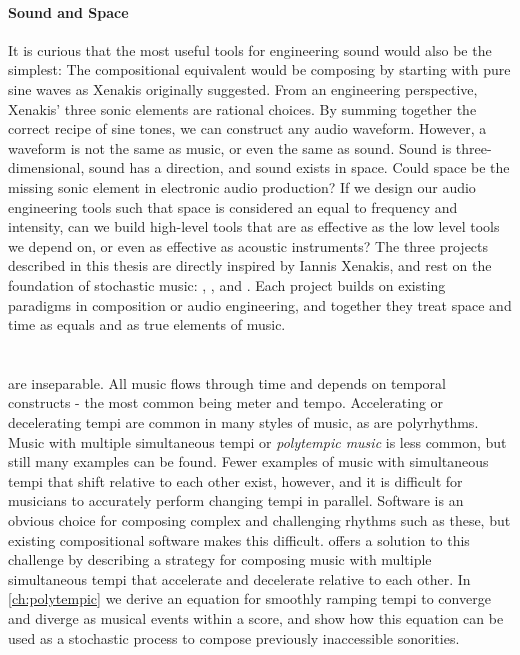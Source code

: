 \paragraph{Sound and Space}
It is curious that the most useful tools for engineering sound would
also be the simplest: The compositional equivalent would be composing
by starting with pure sine waves as Xenakis originally suggested.
From an engineering perspective, Xenakis' three sonic elements are
rational choices. By summing together the correct recipe of sine
tones, we can construct any audio waveform. However, a waveform is not
the same as music, or even the same as sound. Sound is
three-dimensional, sound has a direction, and sound exists in
space. Could space be the missing sonic element in electronic audio
production? If we design our audio engineering tools such that space
is considered an equal to frequency and intensity, can we build
high-level tools that are as effective as the low level tools we depend
on, or even as effective as acoustic instruments? The three projects
described in this thesis are directly inspired by Iannis Xenakis, and rest on
the foundation of stochastic music:  \polytempic, , and
\thesis. Each project builds on existing paradigms in composition or
audio engineering, and together they treat space and time as equals
and as true elements of music.


\section{\polytempic}
\label{sec:polytempic-intro}
 are inseparable. All music flows through
time and depends on temporal constructs - the most common being meter
and tempo. Accelerating or decelerating tempi are common in many
styles of music, as are polyrhythms.  Music with multiple simultaneous
tempi or \textit{polytempic music} is less common, but still many
examples can be found. Fewer examples of music with simultaneous tempi
that shift relative to each other exist, however, and it is difficult
for musicians to accurately perform changing tempi in
parallel. Software is an obvious choice for composing complex and
challenging rhythms such as these, but existing compositional software
makes this difficult. \polytempic offers a solution to this challenge
by describing a strategy for composing music with multiple
simultaneous tempi that accelerate and decelerate relative to each
other. In \autoref{ch:polytempic} we derive an equation for smoothly
ramping tempi to converge and diverge as musical events within a
score, and show how this equation can be used as a stochastic process
to compose previously inaccessible sonorities.

